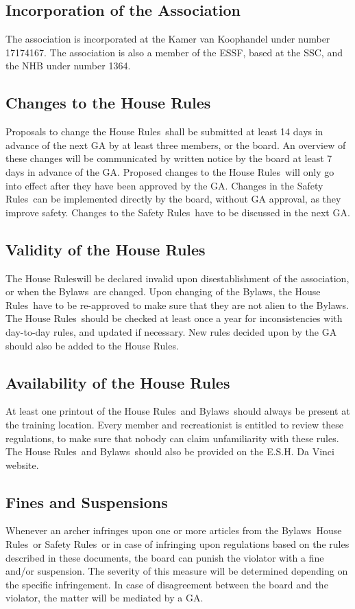 \documentclass[a4paper]{article}
\newcommand{\Asta}{Bylaws} %
\newcommand{\Ahr}{House Rules} %
\newcommand{\Asr}{Safety Rules} %
\begin{document}
\subsection{Incorporation of the Association}
The association is incorporated at the Kamer van Koophandel under number 17174167. The association is also a member of the ESSF, based at the SSC, and the NHB under number 1364.

\subsection{Changes to the \Ahr}
Proposals to change the \Ahr\ shall be submitted at least 14 days in advance of the next GA by at least three members, or the board. An overview of these changes will be communicated by written notice by the board at least 7 days in advance of the GA. Proposed changes to the \Ahr\ will only go into effect after they have been approved by the GA. Changes in the \Asr\ can be implemented directly by the board, without GA approval, as they improve safety. Changes to the \Asr\ have to be discussed in the next GA.

\subsection{Validity of the \Ahr}
The \Ahr will be declared invalid upon disestablishment of the association, or when the \Asta\ are changed. Upon changing of the \Asta , the \Ahr\ have to be re-approved to make sure that they are not alien to the \Asta . The \Ahr\ should be checked at least once a year for inconsistencies with day-to-day rules, and updated if necessary. New rules decided upon by the GA should also be added to the \Ahr .

\subsection{Availability of the \Ahr}
At least one printout of the \Ahr\ and \Asta\ should always be present at the training location. Every member and recreationist is entitled to review these regulations, to make sure that nobody can claim unfamiliarity with these rules. The \Ahr\ and \Asta\ should also be provided on the E.S.H. Da Vinci website.

\subsection{Fines and Suspensions}
Whenever an archer infringes upon one or more articles from the \Asta\, \Ahr\ or \Asr\, or in case of infringing upon regulations based on the rules described in these documents, the board can punish the violator with a fine and/or suspension. The severity of this measure will be determined depending on the specific infringement. In case of disagreement between the board and the violator, the matter will be mediated by a GA.
\end{document}
